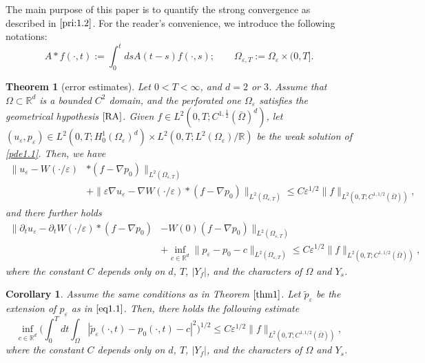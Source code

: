 \documentclass[13pt,CJK]{article}
\theoremstyle{plain}                       %
\newtheorem{theorem}[lemma]{Theorem}
\newtheorem{corollary}[lemma]{Corollary}
\theoremstyle{remark}
\numberwithin{equation}{section}
\begin{document}
\medskip

The main purpose of this paper is to quantify the strong convergence  as described in $\eqref{pri:1.2}$. For the reader's convenience, we introduce the following notations:
\begin{equation*}
A\ast f(\cdot,t) := \int_{0}^{t}ds A(t-s)f(\cdot,s);\qquad
\Omega_{\varepsilon,T}:=\Omega_{\varepsilon}\times(0,T].
\end{equation*}

\begin{theorem}[error estimates]\label{thm1}
Let $0<T<\infty$, and $d=2$ or $3$. Assume that
$\Omega\subset\mathbb{R}^d$ is a bounded $C^{2}$ domain, and
the perforated one $\Omega_\varepsilon$
satisfies the geometrical hypothesis $\eqref{RA}$.
Given $f\in L^2(0,T;C^{1,\frac{1}{2}}
(\bar{\Omega})^d)$,
let $(u_{\varepsilon},p_{\varepsilon})
\in L^2(0,T;H^1_0(\Omega_{\varepsilon})^d)
\times L^2(0,T;L^2(\Omega_{\varepsilon})/\mathbb{R})$
be the weak solution of \eqref{pde1.1}.
Then, we have
\begin{equation}\label{es1.1}
\begin{aligned}
\|u_{\varepsilon}-W({\cdot}/{\varepsilon})
&\ast
(f-\nabla p_{0})\|_{
L^{2}(\Omega_{\varepsilon, T})}\\
&+\|\varepsilon \nabla u_{\varepsilon}-
\nabla W({\cdot}/{\varepsilon})\ast(f-\nabla p_0)
\|_{L^2(\Omega_{\varepsilon, T})}
\leq C\varepsilon^{1/2}
\|f\|_{L^2(0,T;C^{1,1/2}(\bar\Omega))},
\end{aligned}
\end{equation}
and there further holds
\begin{equation}\label{pri:1.3}
\begin{aligned}
\|\partial_t u_\varepsilon
-\partial_tW(\cdot/\varepsilon)*(f-
\nabla p_0)
&-W(0)(f
-\nabla p_0)\|_{L^2(\Omega_{\varepsilon,T})}\\
&+\inf_{c\in\mathbb{R}^d}\|p_\varepsilon-p_0
 -c\|_{L^2(\Omega_{\varepsilon,T})}
\leq C\varepsilon^{1/2}
\|f\|_{L^2(0,T;C^{1,1/2}(\bar\Omega))},
\end{aligned}
\end{equation}
where the constant $C$ depends only on $d$, $T$, $|Y_f|$, and the characters of $\Omega$ and $Y_s$.
\end{theorem}

\begin{corollary}\label{cor:2}
Assume the same conditions as in Theorem $\ref{thm1}$. Let $\tilde{p}_\varepsilon$ be
the extension of $p_\varepsilon$ as
in $\eqref{eq1.1}$.
Then, there holds the following estimate
\begin{equation}\label{pri:1.4}
   \inf_{c\in\mathbb{R}^d}\Big(\int_{0}^{T}dt
   \int_{\Omega}|\tilde{p}_{\varepsilon}(\cdot,t)-p_0(\cdot,t)-c|^2\Big)^{1/2}
   \leq C \varepsilon^{1/2}\|f\|_{L^2(0,T;C^{1,1/2}(\bar\Omega))},
\end{equation}
where the constant $C$ depends only on $d$, $T$, $|Y_f|$, and the characters of $\Omega$ and $Y_s$.
\end{corollary}
\end{document}
